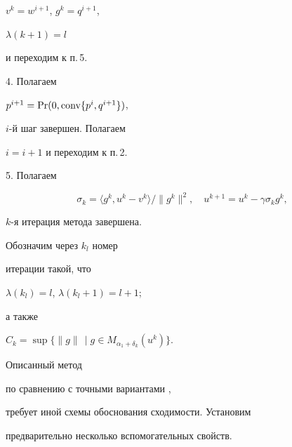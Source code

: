 $v^{k} = w^{i+1}$, $ g^{k}=q^{i+1}$,


$\lambda (k+1)=l$


и переходим к п.\,5.





4. Полагаем


$p^{i+1}=\operatorname{Pr}(0,{\operatorname{conv}} \{p^{i},q^{i+1}\})$,


$i$-й шаг завершен. Полагаем


$i=i+1$ и переходим к п.\,2.





5. Полагаем


\begin{equation}


\label{eq:6}


\sigma _{k}=\langle g^{k}, u^{k}-v^{k} \rangle / \| g^{k}\| ^{2},\quad


u^{k+1}= u^{k}- \gamma \sigma _{k} g^{k},


\end{equation}


$k$-я итерация метода завершена.





Обозначим через $k_{l}$ номер


итерации такой, что


$\lambda (k_{l})=l$, $\lambda (k_{l}+1)=l+1$;


а также


$C_{k} = \sup\{\|g\|\,\mid


g \in M_{\alpha_{1}+\delta_{k}}(u^{k}) \}$.





Описанный метод 


по сравнению с точными вариантами \cite{Kon93a}, \cite{Kon96}


требует иной схемы обоснования сходимости. Установим


предварительно несколько вспомогательных свойств.








